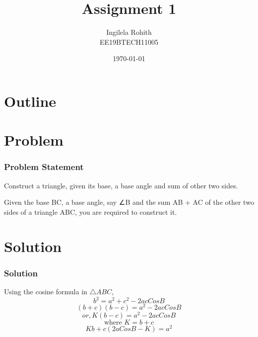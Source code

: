 \documentclass{beamer}
\title{Assignment 1}
\author{Ingilela Rohith \\ EE19BTECH11005}
\date{\today}
\theoremstyle{remark}
\numberwithin{equation}{section}
\begin{document}
\begin{frame}
\titlepage
\end{frame}

\section*{Outline}
\begin{frame}
\tableofcontents
\end{frame}
\section{Problem}
\begin{frame}
\frametitle{Problem Statement}
Construct a triangle, given its base, a base angle and sum
of other two sides. \\
\vspace{10pt}

Given the base BC, a base angle, say ∠B and the sum AB + AC of the other two sides of a triangle ABC, you are required to construct it.
\begin{center}
\end{center}

\end{frame}

\section{Solution}
\begin{frame}
\frametitle{Solution}

Using the cosine formula in $\triangle ABC$,
\begin{equation}
    b^2 = a^2 + c^2 - 2ac Cos B    
\end{equation}
\begin{equation}
    (b + c)(b - c) = a^2 - 2ac Cos B
\end{equation}
\begin{equation}
    or, K(b - c) = a^2 - 2ac Cos B
\end{equation}
\begin{equation}
    \text{where }  K = b + c
\end{equation}
\begin{equation}
    Kb + c (2aCosB - K) = a^2
\end{equation}
\end{frame}
\end{document}

